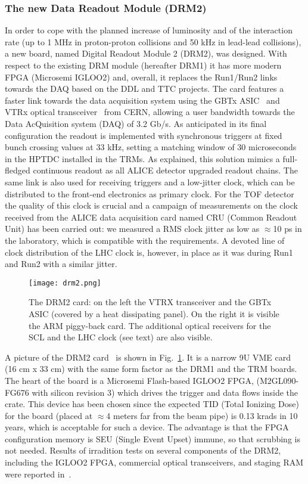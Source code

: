 \subsubsection{The new Data Readout Module (DRM2)}
In order to cope with the planned increase of luminosity and of the interaction rate (up to 1 MHz in proton-proton collisions and 50 kHz in lead-lead collisions), a new board, named Digital Readout Module 2 (DRM2), was designed. With respect to the existing DRM module (hereafter DRM1) it has more modern FPGA (Microsemi IGLOO2) and, overall, it replaces the Run1/Run2 links towards the DAQ based on the DDL and TTC projects. The card features a faster link towards the data acquisition system using the GBTx ASIC~\cite{GBTx} and VTRx optical transceiver~\cite{VTRX} from CERN, allowing a user bandwidth towards the Data AcQuisition system (DAQ) of 3.2 Gb/s. As anticipated in its final configuration the readout is implemented with synchronous triggers at fixed bunch crossing values at 33 kHz, setting a matching window of 30 microseconds in the HPTDC installed in the TRMs. As explained, this solution mimics a full-fledged continuous readout as all ALICE detector upgraded readout chains. The same link is also used for receiving triggers and a low-jitter clock, which can be distributed to the front-end electronics as primary clock. For the TOF detector the quality of this clock is crucial and a campaign of measurements on the clock received from the ALICE data acquisition card named CRU (Common Readout Unit) has been carried out: we measured a RMS clock jitter as low as $\approx$10 ps in the laboratory, which is compatible with the requirements. A devoted line of clock distribution of the LHC clock is, however, in place as it was during Run1 and Run2 with a similar jitter.

\begin{figure}[t!]
\centering
\texttt{[image: drm2.png]} 
\caption{The DRM2 card: on the left the VTRX transceiver and the GBTx ASIC (covered by a heat dissipating panel). On the right it is visible the ARM piggy-back card. The additional optical receivers for the SCL and the LHC clock (see text) are also visible.}
\label{fig:drm2}
\end{figure}


A picture of the DRM2 card~\cite{Falchieri:2018fqw} is shown in Fig.~\ref{fig:drm2}. It is a narrow 9U VME card (16 cm x 33 cm) with the same form factor as the DRM1 and the TRM boards. The heart of the board is a Microsemi Flash-based IGLOO2 FPGA, (M2GL090-FG676 with silicon revision 3) which drives the trigger and data flows inside the crate. This device has been chosen since the expected TID (Total Ionizing Dose) for the board (placed at $\approx$4 meters far from the beam pipe) is 0.13 krads in 10 years, which is acceptable for such a device. The advantage is that the FPGA configuration memory is SEU (Single Event Upset) immune, so that scrubbing is not needed. Results of irradition tests on several components of the DRM2, including the IGLOO2 FPGA, commercial optical transceivers, and staging RAM were reported in~\cite{Falchieri:2019ulw}.

